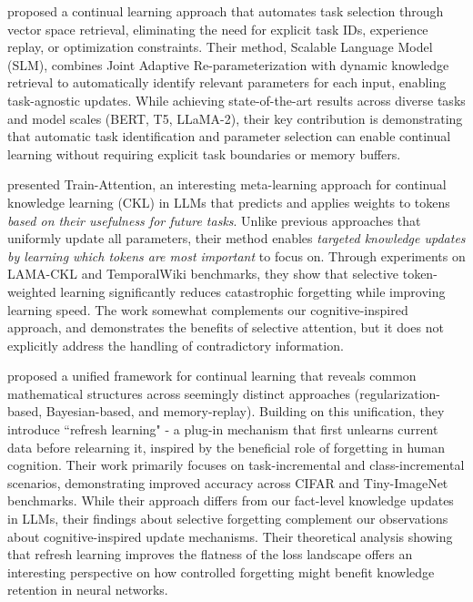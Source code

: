 \citet{peng2024scalable} proposed a continual learning approach that automates task selection through vector space retrieval, eliminating the need for explicit task IDs, experience replay, or optimization constraints. Their method, Scalable Language Model (SLM), combines Joint Adaptive Re-parameterization with dynamic knowledge retrieval to automatically identify relevant parameters for each input, enabling task-agnostic updates. While achieving state-of-the-art results across diverse tasks and model scales (BERT, T5, LLaMA-2), their key contribution is demonstrating that automatic task identification and parameter selection can enable continual learning without requiring explicit task boundaries or memory buffers.

\citet{seo2024train} presented Train-Attention, an interesting meta-learning approach for continual knowledge learning (CKL) in LLMs that predicts and applies weights to tokens \textit{based on their usefulness for future tasks}. Unlike previous approaches that uniformly update all parameters, their method enables\textit{ targeted knowledge updates by learning which tokens are most important} to focus on. Through experiments on LAMA-CKL and TemporalWiki benchmarks, they show that selective token-weighted learning significantly reduces catastrophic forgetting while improving learning speed. The work somewhat complements our cognitive-inspired approach, and demonstrates the benefits of selective attention, but it does not explicitly address the handling of contradictory information.

\citet{wang2024unified} proposed a unified framework for continual learning that reveals common mathematical structures across seemingly distinct approaches (regularization-based, Bayesian-based, and memory-replay). Building on this unification, they introduce ``refresh learning" - a plug-in mechanism that first unlearns current data before relearning it, inspired by the beneficial role of forgetting in human cognition. Their work primarily focuses on task-incremental and class-incremental scenarios, demonstrating improved accuracy across CIFAR and Tiny-ImageNet benchmarks. While their approach differs from our fact-level knowledge updates in LLMs, their findings about selective forgetting complement our observations about cognitive-inspired update mechanisms. Their theoretical analysis showing that refresh learning improves the flatness of the loss landscape offers an interesting perspective on how controlled forgetting might benefit knowledge retention in neural networks.

